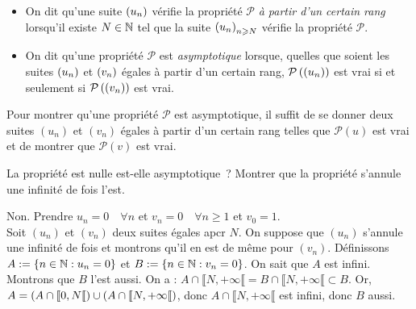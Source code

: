\documentclass{magnolia}
\begin{document}
\begin{definition}[utile=-3]
\begin{itemize}
\item On dit qu'une suite $\left(u_n\right)$ vérifie la propriété $\mathcal{P}$ \emph{à partir
  d'un certain rang} lorsqu'il existe $N\in\mathbb{N}$ tel que la suite
  $\left(u_n\right)_{n\geqslant N}$ vérifie la propriété $\mathcal{P}$.
\item On dit qu'une propriété $\mathcal{P}$ est \emph{asymptotique} lorsque, quelles que
  soient les suites $\left(u_n\right)$ et $\left(v_n\right)$ égales à partir d'un certain rang,
  $\mathcal{P}\left(\left(u_n\right)\right)$ est vrai si et seulement si $\mathcal{P}\left(\left(v_n\right)\right)$
  est vrai.
\end{itemize}
\end{definition}

\begin{remarqueUnique}
\remarque Pour montrer qu'une propriété $\mathcal{P}$ est asymptotique, il
  suffit de se donner deux suites $(u_n)$ et $(v_n)$ égales à partir d'un
  certain rang telles que $\mathcal{P}(u)$ est vrai et de montrer que
  $\mathcal{P}(v)$ est vrai.
\end{remarqueUnique}

\begin{exoUnique}
\exo La propriété \og est nulle \fg est-elle asymptotique~? Montrer que la
  propriété \og s'annule une infinité de fois \fg l'est.
\end{exoUnique}

\begin{sol}
Non. Prendre $u_n=0 \quad \forall n$ et $v_n=0 \quad \forall n\geq 1$ et $v_0=1$.\\
Soit $(u_n)$ et $(v_n)$ deux suites égales apcr $N$. On suppose que $(u_n)$ s'annule une infinité de fois et montrons qu'il en est de même pour $(v_n)$. Définissons $A:=\left\{n\in\mathbb{N} : u_n=0\right\}$ et $B:=\left\{n\in\mathbb{N} : v_n=0\right\}$. On sait que $A$ est infini. Montrons que $B$ l'est aussi.
On a : $A\cap \llbracket N,+\infty \llbracket=B\cap \llbracket N,+\infty \llbracket \subset B.$ Or, $A=\left(A\cap \llbracket 0,N \llbracket \right)\cup \left(A\cap \llbracket N,+\infty \llbracket\right)$, donc $A\cap \llbracket N,+\infty \llbracket$ est infini, donc $B$ aussi.

\end{sol}

\end{document}
